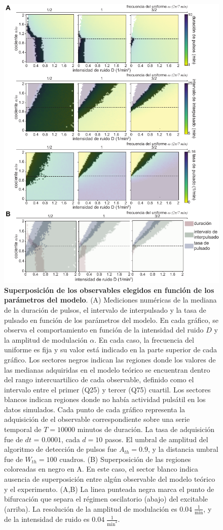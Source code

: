 \documentclass[./main.tex]{subfiles}
\begin{document}
 \begin{figure}
    \centering
    \includegraphics[width=1\columnwidth]{figures/chapter6/C6_2d_plots_superposition.pdf} 
    \caption{\textbf{Superposición de los observables elegidos en función de los parámetros del modelo}. (A) Mediciones numéricas de la mediana de la duración de pulsos, el intervalo de interpulsado y la tasa de pulsado en función de los parámetros del modelo. En cada gráfico, se observa el comportamiento en función de la intensidad del ruido $D$ y la amplitud de modulación $\alpha$. En cada caso, la frecuencia del uniforme es fija y su valor está indicado en la parte superior de cada gráfico. Los sectores negros indican las regiones donde los valores de las medianas adquiridas en el modelo teórico se encuentran dentro del rango intercuartilico de cada observable, definido como el intervalo entre el primer (Q25) y tercer (Q75) cuartil. Los sectores blancos indican regiones donde no había actividad pulsátil en los datos simulados. Cada punto de cada gráfico representa la adquisición de el observable correspondiente sobre una serie temporal de $T = 10000$ minutos de duración. La tasa de adquisición fue de $dt$ = $0.0001$, cada $d = 10$ pasos. El umbral de amplitud del algoritmo de detección de pulsos fue $A_{th} = 0.9$, y la distancia umbral fue de $W_{th} = 100\text{ cuadros}$. (B) Superposición de las regiones coloreadas en negro en A. En este caso, el sector blanco indica ausencia de superposición entre algún observable del modelo teórico y el experimento. (A,B) La linea punteada negra marca el punto de bifurcación que separa el régimen oscilatorio (abajo) del excitable (arriba). La resolución de la amplitud de modulación es $0.04\; \frac{1}{\text{min}}$, y de la intensidad de ruido es $0.04\; \frac{1}{\text{min}^2}$.}

\end{figure}
\end{document}
